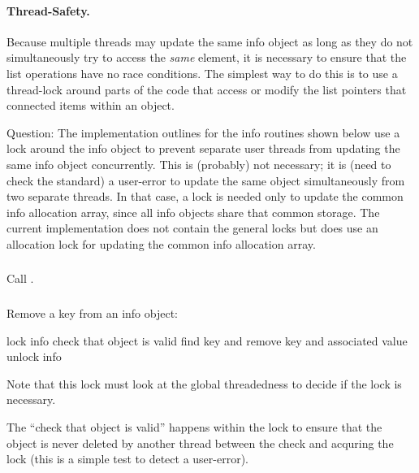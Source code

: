\documentclass{article}
\begin{document}
\paragraph{Thread-Safety.}
Because multiple threads may update the same info object as long as
they do not simultaneously try to access the \emph{same} element, it
is necessary to ensure that the list operations have no race
conditions.  The simplest way to do this is to use a thread-lock
around parts of the code that access or modify the list pointers that
connected items within an  object.

Question: The implementation outlines for the info routines shown
below use a lock around the info object to prevent separate user
threads from updating the same info object concurrently.  This is
(probably) not necessary; it is (need to check the standard) a
user-error to update the same object simultaneously from two separate
threads.  In that case, a lock is needed only to update the common
info allocation array, since all info objects share that common
storage.  The current implementation does not contain the general
locks but does use an allocation lock for updating the common info
allocation array.

\subsubsection{}
Call .

\subsubsection{}
Remove a key from an info object:
\begin{algorithm}
lock info
check that object is valid
find key and remove key and associated value
unlock info
\end{algorithm}
Note that this lock must look at the global threadedness to decide if
the lock is necessary.  

The ``check that object is valid'' happens within
the lock to ensure that the object is never deleted by another thread
between the check and acquring the lock (this is a simple test to
detect a user-error).
\end{document}
